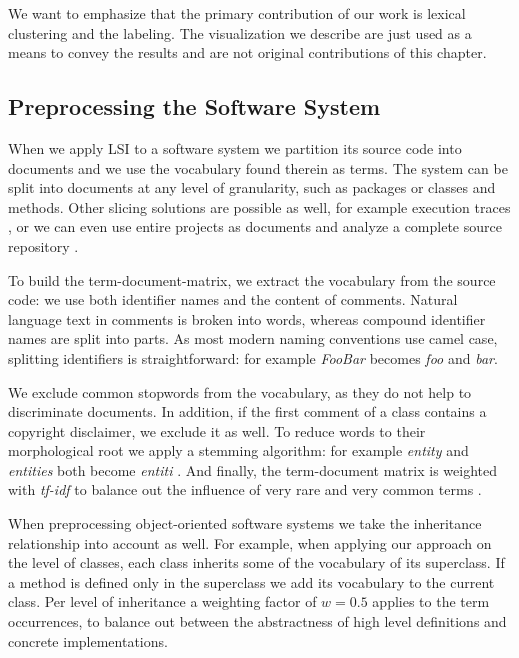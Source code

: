 We want to emphasize that the primary contribution of our work is lexical clustering and the labeling. The visualization we describe are just used as a means to convey the results and are not original contributions of this chapter.

\subsection{Preprocessing the Software System}\label{sec:parsing}

When we apply LSI to a software system we partition its source code into documents and we use the vocabulary found therein as terms. The system can be split into documents at any level of granularity, such as packages or classes and methods. Other slicing solutions are possible as well, for example execution traces \cite{Kuhn05b}, or we can even use entire projects as documents and analyze a complete source repository \cite{Kawa04a}.

To build the term-document-matrix, we extract the vocabulary from the source code: we use both identifier names and the content of comments. Natural language text in comments is broken into words, whereas compound identifier names are split into parts. As most modern naming conventions use camel case, splitting identifiers is straightforward: for example \emph{FooBar} becomes \emph{foo} and \emph{bar}.

We exclude common stopwords from the vocabulary, as they do not help to discriminate documents. In addition, if the first comment of a class contains a copyright disclaimer, we exclude it as well. To reduce words to their morphological root we apply a stemming algorithm: for example \emph{entity} and \emph{entities} both become \emph{entiti} \cite{Port80a}. And finally, the term-document matrix is weighted with \emph{tf-idf} to balance out the influence of very rare and very common terms \cite{Duma91a}.

When preprocessing object-oriented software systems we take the inheritance relationship into account as well. For example, when applying our approach on the level of classes, each class inherits some of the vocabulary of its superclass. If a method is defined only in the superclass we add its vocabulary to the current class. Per level of inheritance a weighting factor of $w = 0.5$ applies to the term occurrences, to balance out between the abstractness of high level definitions and concrete implementations.

